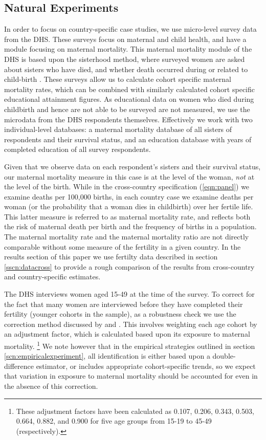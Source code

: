 \documentclass{article}[12pt,subeqn]
\begin{document}
\begin{spacing}{1.4}
\subsection{Natural Experiments}
\label{sscn:dataexp}
In order to focus on country-specific case studies, we use micro-level survey 
data from the DHS. These surveys focus on 
maternal and child health, and have a module focusing on maternal mortality. This 
maternal mortality module of the DHS is based upon the sisterhood method, where 
surveyed women are asked about sisters who have died, and whether death occurred during 
or related to child-birth \citep{RutsteinRojas2006}. These surveys allow us to 
calculate cohort specific maternal mortality rates, which can be combined with 
similarly calculated cohort specific educational attainment figures. As 
educational data on women who died during childbirth and hence are not able to be
surveyed are not measured, we use the microdata from the DHS respondents 
themselves.  Effectively we work with two individual-level databases: a maternal 
mortality database of all sisters of respondents and their survival status, and 
an education database with years of completed education of all survey respondents.

Given that we observe data on each respondent's sisters and their survival 
status, our maternal mortality measure in this case is at the level of the woman, 
\emph{not} at the level of the birth.  While in the cross-country specification 
(\ref{eqn:panel}) we examine deaths per 100,000 births, in each country case we 
examine deaths per woman (or the probability that a woman dies in childbirth) 
over her fertile life. This latter measure is referred to as maternal mortality 
rate, and reflects both the risk of maternal death per birth and the frequency of 
births in a population.  The maternal mortality rate and the maternal mortality 
ratio are not directly comparable without some measure of the fertility in a given 
country. In the results section of this paper we use fertilty data described in 
section \ref{sscn:datacross} to provide a rough comparison of the results from 
cross-country and country-specific estimates.

The DHS interviews women aged 15-49 at the time of the survey. To correct 
for the fact that many women are interviewed before they have completed their 
fertility (younger cohorts in the sample), as a robustness check we use the 
correction method discussed by \citet{RutsteinRojas2006} and 
\citet{Stantonetal1997}. This involves weighting each age cohort by an adjustment 
factor, which is calculated based upon its exposure to maternal mortality.%
\footnote{These adjustment factors have been calculated as 0.107, 0.206, 0.343, 
0.503, 0.664, 0.882, and 0.900 for five age groups from 15-19 to 45-49 
(respectively).}  We note however that in the empirical strategies outlined in 
section \ref{scn:empiricalexperiment}, all identification is either based upon a 
double-difference estimator, or includes appropriate cohort-specific trends, so 
we expect that variation in exposure to maternal mortality should be accounted for 
even in the absence of this correction.


\end{spacing}
\end{document}
